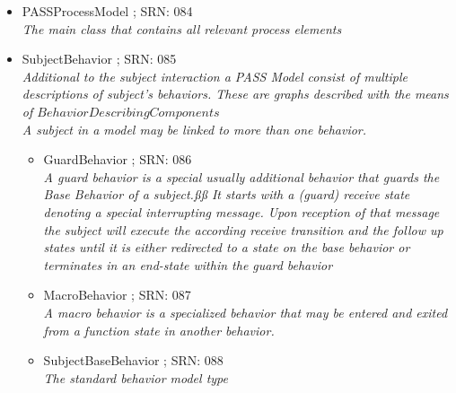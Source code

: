 \begin{itemize}
\begin{itemize}
	\item PASSProcessModel ; SRN: 084 \\ \textit{The main class that contains all relevant process elements}
	\item SubjectBehavior ; SRN: 085 \\ \textit{Additional to the subject interaction a PASS Model consist of multiple descriptions of subject's behaviors. These are graphs described with the means of $BehaviorDescribingComponents$ \\
	A subject in a model may be linked to more than one behavior.}
	\begin{itemize}
		\item GuardBehavior ; SRN: 086 \\ \textit{A guard behavior is a special usually additional behavior that guards the Base Behavior of a subject.ßß
		It starts with a (guard) receive state denoting a special interrupting message. Upon reception of that message the subject will execute the according receive transition and the follow up states until it is either redirected to a state on the base behavior or terminates in an end-state within the guard behavior}
		\item MacroBehavior ; SRN: 087 \\ \textit{A macro behavior is a specialized behavior that may be entered and exited from a function state in another behavior.}
		\item SubjectBaseBehavior ; SRN: 088 \\ \textit{The standard behavior model type}
	\end{itemize}
\end{itemize}
	
	
	
	
	

\end{itemize}
